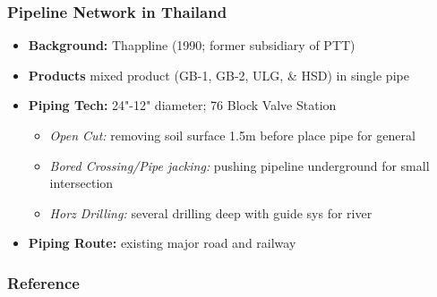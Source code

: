 \documentclass[10pt,presentation]{beamer}
\begin{document}
\begin{frame}
  \frametitle{Pipeline Network in Thailand}

  \begin{itemize}
    \item \textbf{Background:} Thappline (1990; former subsidiary of PTT)
    \item \textbf{Products} mixed product (GB-1, GB-2, ULG, \& HSD) in single pipe
    \item \textbf{Piping Tech:} 24"-12" diameter; 76 Block Valve Station
    \begin{itemize}
      \item \textsl{Open Cut:} removing soil surface 1.5m before place pipe for general
      \item \textsl{Bored Crossing/Pipe jacking:} pushing pipeline underground for small intersection
      \item \textsl{Horz Drilling:} several drilling deep with guide sys for river
    \end{itemize}
    \item \textbf{Piping Route:} existing major road and railway
  \end{itemize}

  \end{frame}


\begin{frame}
  \frametitle{Reference}

  \begin{footnotesize}
    }
  \end{footnotesize}


\end{frame}

\end{document}
